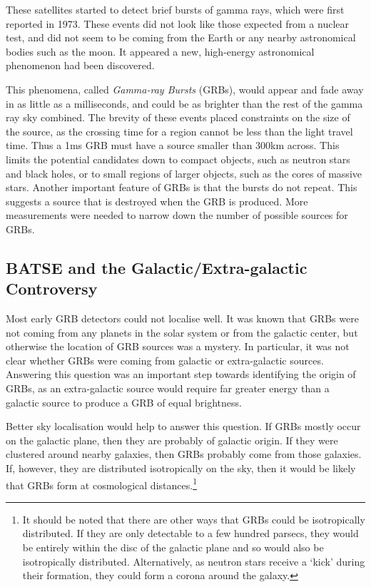 \documentclass[11pt]{cuthesis}
\begin{document}
These satellites started to detect brief bursts of gamma rays, which were first reported in 1973. These events did not look like those expected from a nuclear test, and did not seem to be coming from the Earth or any nearby astronomical bodies such as the moon. It appeared a new, high-energy astronomical phenomenon had been discovered. 

This phenomena, called \textit{Gamma-ray Bursts} (GRBs), would appear and fade away in as little as a milliseconds, and could be as brighter than the rest of the gamma ray sky combined. The brevity of these events placed constraints on the size of the source, as the crossing time for a region cannot be less than the light travel time. Thus a 1ms GRB must have a source smaller than 300km across. This limits the potential candidates down to compact objects, such as neutron stars and black holes, or to small regions of larger objects, such as the cores of massive stars. Another important feature of GRBs is that the bursts do not repeat. This suggests a source that is destroyed when the GRB is produced. More measurements were needed to narrow down the number of possible sources for GRBs. 

\subsection{BATSE and the Galactic/Extra-galactic Controversy}
Most early GRB detectors could not localise well. It was known that GRBs were not coming from any planets in the solar system or from the galactic center, but otherwise the location of GRB sources was a mystery. In particular, it was not clear whether GRBs were coming from galactic or extra-galactic sources. Answering this question was an important step towards identifying the origin of GRBs, as an extra-galactic source would require far greater energy than a galactic source to produce a GRB of equal brightness. 

Better sky localisation would help to answer this question. If GRBs mostly occur on the galactic plane, then they are probably of galactic origin. If they were clustered around nearby galaxies, then GRBs probably come from those galaxies. If, however, they are distributed isotropically on the sky, then it would be likely that GRBs form at cosmological distances.\footnote{It should be noted that there are other ways that GRBs could be isotropically distributed. If they are only detectable to a few hundred parsecs, they would be entirely within the disc of the galactic plane and so would also be isotropically distributed. Alternatively, as neutron stars receive a `kick' during their formation, they could form a corona around the galaxy.}
\end{document}
